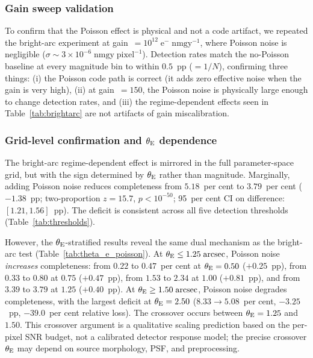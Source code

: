 \documentclass[fleqn,usenatbib]{mnras}
\begin{document}
\subsubsection{Gain sweep validation}
\label{sec:gainsweep}

To confirm that the Poisson effect is physical and not a code artifact, we repeated the bright-arc experiment at gain~$= 10^{12}\;\mathrm{e^{-}\;nmgy^{-1}}$, where Poisson noise is negligible ($\sigma \sim 3 \times 10^{-6}\;\mathrm{nmgy\;pixel^{-1}}$).  Detection rates match the no-Poisson baseline at every magnitude bin to within $0.5$~pp ($= 1/N$), confirming three things: (i) the Poisson code path is correct (it adds zero effective noise when the gain is very high), (ii) at gain~$= 150$, the Poisson noise is physically large enough to change detection rates, and (iii) the regime-dependent effects seen in Table~\ref{tab:brightarc} are not artifacts of gain miscalibration.


\subsubsection{Grid-level confirmation and $\theta_{\rm E}$ dependence}

The bright-arc regime-dependent effect is mirrored in the full parameter-space grid, but with the sign determined by $\theta_{\rm E}$ rather than magnitude.  Marginally, adding Poisson noise reduces completeness from $5.18$~per cent to $3.79$~per cent ($-1.38$~pp; two-proportion $z = 15.7$, $p < 10^{-50}$; 95~per cent CI on difference: $[1.21, 1.56]$~pp).  The deficit is consistent across all five detection thresholds (Table~\ref{tab:thresholds}).

However, the $\theta_{\rm E}$-stratified results reveal the same dual mechanism as the bright-arc test (Table~\ref{tab:theta_e_poisson}).  At $\theta_{\rm E} \leq 1.25\;\mathrm{arcsec}$, Poisson noise \emph{increases} completeness: from $0.22$ to $0.47$~per cent at $\theta_{\rm E} = 0.50$ ($+0.25$~pp), from $0.33$ to $0.80$ at $0.75$ ($+0.47$~pp), from $1.53$ to $2.34$ at $1.00$ ($+0.81$~pp), and from $3.39$ to $3.79$ at $1.25$ ($+0.40$~pp).  At $\theta_{\rm E} \geq 1.50\;\mathrm{arcsec}$, Poisson noise degrades completeness, with the largest deficit at $\theta_{\rm E} = 2.50$ ($8.33 \to 5.08$~per cent, $-3.25$~pp, $-39.0$~per cent relative loss).  The crossover occurs between $\theta_{\rm E} = 1.25$ and $1.50$.  This crossover argument is a qualitative scaling prediction based on the per-pixel SNR budget, not a calibrated detector response model; the precise crossover $\theta_{\rm E}$ may depend on source morphology, PSF, and preprocessing.
\end{document}
